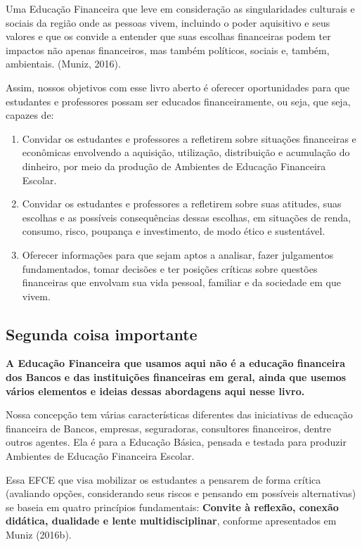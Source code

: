 \begin{apresentacao}
Uma Educação Financeira que leve em consideração as singularidades culturais e sociais da região onde as pessoas vivem, incluindo o poder aquisitivo e seus valores e que os convide a entender que suas escolhas financeiras podem ter impactos não apenas financeiros, mas também políticos, sociais e, também, ambientais. (Muniz, 2016).


Assim, nossos objetivos com esse livro aberto é oferecer oportunidades para que estudantes e professores possam ser educados financeiramente, ou seja, que seja, capazes de:

\begin{enumerate}[label=\arabic* --, leftmargin=0pt]
  \item Convidar os estudantes e professores a refletirem sobre situações financeiras e econômicas envolvendo a aquisição, utilização, distribuição e acumulação do dinheiro, por meio da produção de Ambientes de Educação Financeira Escolar.

  \item Convidar os estudantes e professores a refletirem sobre suas atitudes, suas escolhas e as possíveis consequências dessas escolhas, em situações de renda, consumo, risco, poupança e investimento, de modo ético e sustentável. 

  \item Oferecer informações para que sejam aptos a analisar, fazer julgamentos fundamentados, tomar decisões e ter posições críticas sobre questões financeiras que envolvam sua vida pessoal, familiar e da sociedade em que vivem.
\end{enumerate}

\subsection{Segunda coisa importante} 
\begin{center}
\textbf{A Educação Financeira que usamos aqui não é a educação financeira dos Bancos e das instituições financeiras em geral, ainda que usemos vários elementos e ideias dessas abordagens aqui nesse livro.}
\end{center}

Nossa concepção tem várias características diferentes das iniciativas de educação financeira de Bancos, empresas, seguradoras, consultores financeiros, dentre outros agentes. Ela é para a Educação Básica, pensada e testada para produzir Ambientes de Educação Financeira Escolar. 

Essa EFCE que visa mobilizar os estudantes a pensarem de forma crítica (avaliando opções, considerando seus riscos e pensando em possíveis alternativas) se baseia em quatro princípios fundamentais: \textbf{Convite à reflexão, conexão didática, dualidade e lente multidisciplinar}, conforme apresentados em Muniz (2016b).


\end{apresentacao}
